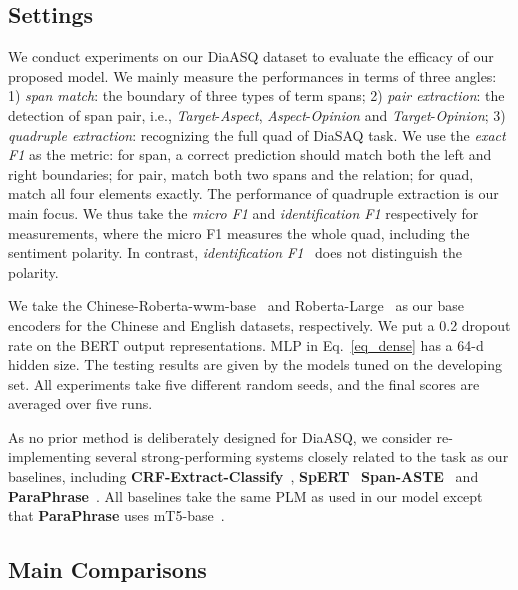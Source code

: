 \documentclass[11pt]{article}
\begin{document}
\vspace{-2mm}
\subsection{Settings}

\vspace{-1mm}
We conduct experiments on our DiaASQ dataset to evaluate the efficacy of our proposed model.
We mainly measure the performances in terms of three angles:
1) \emph{span match}: the boundary of three types of term spans;
2) \emph{pair extraction}: the detection of span pair, i.e., \emph{Target}-\emph{Aspect}, \emph{Aspect}-\emph{Opinion} and \emph{Target}-\emph{Opinion};
3) \emph{quadruple extraction}: recognizing the full quad of DiaSAQ task.
We use the \emph{exact F1} as the metric: for span, a correct prediction should match both the left and right boundaries; for pair, match both two spans and the relation; for quad, match all four elements exactly.
The performance of quadruple extraction is our main focus.
We thus take the \emph{micro F1} and \emph{identification F1} respectively for measurements, where the micro F1 measures the whole quad, including the sentiment polarity.
In contrast, \emph{identification F1}~\cite{barnes-etal-2021-structured} does not distinguish the polarity.

We take the Chinese-Roberta-wwm-base~\cite{CuiCLQY21} and Roberta-Large~\cite{roberta-liu} as our base encoders for the Chinese and English datasets, respectively.
We put a 0.2 dropout rate on the BERT output representations.
MLP in Eq.~\eqref{eq_dense} has a 64-d hidden size.
The testing results are given by the models tuned on the developing set.
All experiments take five different random seeds, and the final scores are averaged over five runs.

As no prior method is deliberately designed for DiaASQ, we consider re-implementing several strong-performing systems closely related to the task as our baselines, including 
\textbf{CRF-Extract-Classify}~\cite{CaiXY20},
\textbf{SpERT}~\cite{EbertsU20}
\textbf{Span-ASTE}~\cite{XuCB20} and
\textbf{ParaPhrase}~\cite{ZhangD0YBL21}.
All baselines take the same PLM as used in our model except that \textbf{ParaPhrase} uses mT5-base~\cite{XueCRKASBR21}.

\subsection{Main Comparisons}
\end{document}
